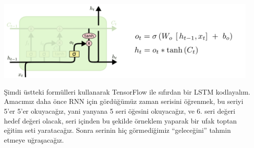\documentclass[12pt,fleqn]{article}\usepackage{../../common}
\begin{document}
\includegraphics[width=35em]{lstm_07.png}

Şimdi üstteki formülleri kullanarak TensorFlow ile sıfırdan bir LSTM
kodlayalım. Amacımız daha önce RNN için gördüğümüz zaman serisini öğrenmek,
bu seriyi 5'er 5'er okuyacağız, yani yanyana 5 seri öğesini okuyacağız, ve
6. seri değeri hedef değeri olacak, seri içinden bu şekilde örneklem
yaparak bir ufak toptan eğitim seti yaratacağız. Sonra serinin hiç
görmediğimiz ``geleceğini'' tahmin etmeye uğraşacağız.
\end{document}
